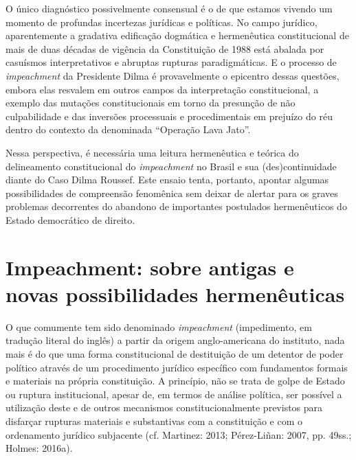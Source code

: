 O único diagnóstico possivelmente consensual é o de que estamos vivendo
um momento de profundas incertezas jurídicas e políticas. No campo
jurídico, aparentemente a gradativa edificação dogmática e hermenêutica
constitucional de mais de duas décadas de vigência da Constituição de
1988 está abalada por casuísmos interpretativos e abruptas rupturas
paradigmáticas. E o processo de \emph{impeachment} da Presidente Dilma é
provavelmente o epicentro dessas questões, embora elas resvalem em
outros campos da interpretação constitucional, a exemplo das mutações
constitucionais em torno da presunção de não culpabilidade e das
inversões processuais e procedimentais em prejuízo do réu dentro do
contexto da denominada ``Operação Lava Jato''.

Nessa perspectiva, é necessária uma leitura hermenêutica e teórica do
delineamento constitucional do \emph{impeachment} no Brasil e sua
(des)continuidade diante do Caso Dilma Roussef. Este ensaio tenta,
portanto, apontar algumas possibilidades de compreensão fenomênica sem
deixar de alertar para os graves problemas decorrentes do abandono de
importantes postulados hermenêuticos do Estado democrático de direito.

\section{Impeachment: sobre antigas e novas possibilidades
  hermenêuticas}

O que comumente tem sido denominado \emph{impeachment} (impedimento, em
tradução literal do inglês) a partir da origem anglo-americana do
instituto, nada mais é do que uma forma constitucional de destituição de
um detentor de poder político através de um procedimento jurídico
específico com fundamentos formais e materiais na própria constituição.
A princípio, não se trata de golpe de Estado ou ruptura institucional,
apesar de, em termos de análise política, ser possível a utilização
deste e de outros mecanismos constitucionalmente previstos para
disfarçar rupturas materiais e substantivas com a constituição e com o
ordenamento jurídico subjacente (cf. Martinez: 2013; Pérez-Liñan: 2007,
pp. 49ss.; Holmes: 2016a).

